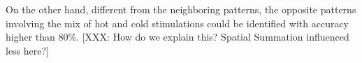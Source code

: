 \documentclass[preprint,12pt]{elsarticle}
\begin{document}
On the other hand, different from the neighboring patterns, the opposite patterns involving the mix of hot and cold stimulations could be identified with accuracy higher than 80\%. [XXX: How do we explain this? Spatial Summation influenced less here?]




\end{document}
